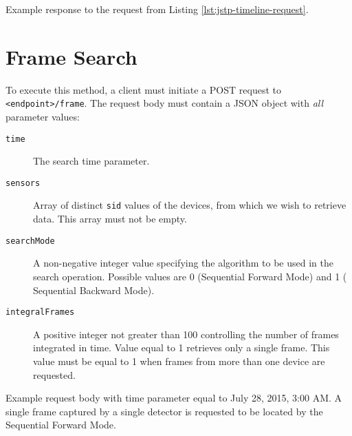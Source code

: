 \begin{listing}
    \caption[JSTP acquisition overview response body.]{Example response to the request from Listing \ref{lst:jstp-timeline-request}.}
    \label{lst:jstp-timeline-response}
\end{listing}

\section{Frame Search}
\label{apx:jstp-frame}
To execute this method, a client must initiate a POST request to \texttt{<endpoint>/frame}. The request body must contain a JSON object with \textit{all} parameter values:
~
\begin{description}
	\item[\texttt{time}]
	The search time parameter.

	\item[\texttt{sensors}]
	Array of distinct \texttt{sid} values of the devices, from which we wish to retrieve data. This array must not be empty.

	\item[\texttt{searchMode}]
	A non-negative integer value specifying the algorithm to be used in the search operation. Possible values are 0 (Sequential Forward Mode) and 1 ( Sequential Backward Mode).

	\item[\texttt{integralFrames}]
	A positive integer not greater than 100 controlling the number of frames integrated in time. Value equal to 1 retrieves only a single frame. This value must be equal to 1 when frames from more than one device are requested.
\end{description}

\begin{listing}
    \caption[JSTP frame search request body.]{Example request body with time parameter equal to July 28, 2015, 3:00 AM. A single frame captured by a single detector is requested to be located by the Sequential Forward Mode.}
    \label{lst:jstp-frames-request}
\end{listing}

